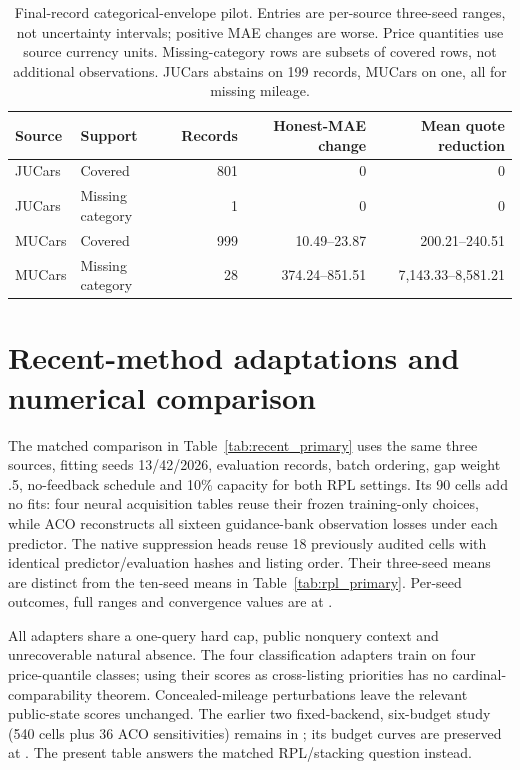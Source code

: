 \documentclass[11pt]{article}
\begin{document}
\begin{table}[htbp]\centering\small
\begin{tabular}{llrrr}\toprule
Source & Support & Records & Honest-MAE change & Mean quote reduction\\\midrule
JUCars & Covered & 801 & 0 & 0\\
JUCars & Missing category & 1 & 0 & 0\\
MUCars & Covered & 999 & 10.49--23.87 & 200.21--240.51\\
MUCars & Missing category & 28 & 374.24--851.51 & 7,143.33--8,581.21\\
\bottomrule\end{tabular}
\caption{Final-record categorical-envelope pilot. Entries are per-source
three-seed ranges, not uncertainty intervals; positive MAE changes are worse.
Price quantities use source currency units. Missing-category rows are subsets
of covered rows, not additional observations. JUCars abstains on 199 records,
MUCars on one, all for missing mileage.}\label{tab:final_record_pilot}
\end{table}
\section{Recent-method adaptations and numerical comparison}\label{app:completion_methods}
The matched comparison in Table~\ref{tab:recent_primary} uses the same
three sources, fitting seeds 13/42/2026, evaluation records, batch ordering,
gap weight .5, no-feedback schedule and 10\% capacity for both RPL settings.
Its 90 cells add no fits: four neural acquisition tables reuse their frozen
training-only choices, while ACO reconstructs all sixteen guidance-bank
observation losses under each predictor. The native suppression heads reuse
18 previously audited cells with identical predictor/evaluation hashes and
listing order. Their three-seed means are distinct from the ten-seed means
in Table~\ref{tab:rpl_primary}. Per-seed outcomes, full ranges and
convergence values are at .

All adapters share a one-query hard cap, public nonquery context and
unrecoverable natural absence. The four classification adapters train on
four price-quantile classes; using their scores as cross-listing priorities
has no cardinal-comparability theorem. Concealed-mileage perturbations leave
the relevant public-state scores unchanged. The earlier two fixed-backend,
six-budget study (540 cells plus 36 ACO sensitivities) remains in
; its budget curves are preserved at
. The present
table answers the matched RPL/stacking question instead.
\end{document}
